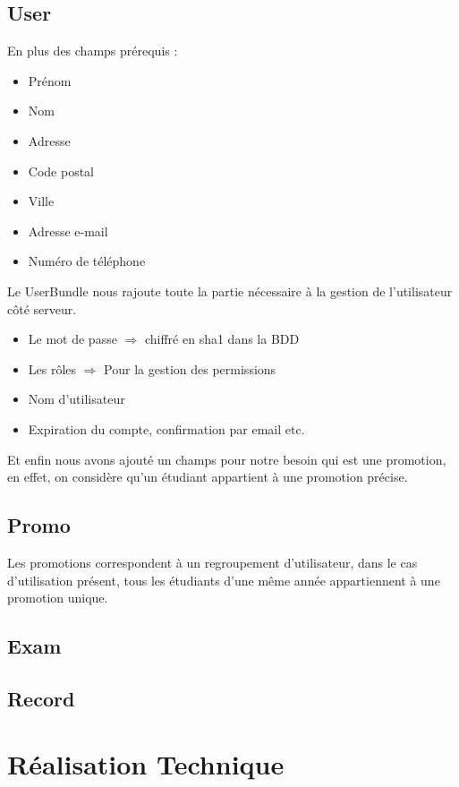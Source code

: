 \documentclass{report}
\begin{document}
    \subsection{User}
      En plus des champs prérequis :
      \begin{itemize}
        \item{Prénom}
        \item{Nom}
        \item{Adresse}
        \item{Code postal}
        \item{Ville}
        \item{Adresse e-mail}
        \item{Numéro de téléphone}
      \end{itemize}

      Le UserBundle nous rajoute toute la partie nécessaire à la gestion de
      l'utilisateur côté serveur.
      \begin{itemize}
        \item{Le mot de passe $\Rightarrow$ chiffré en sha1 dans la BDD}
        \item{Les rôles $\Rightarrow$ Pour la gestion des permissions}
        \item{Nom d'utilisateur}
        \item{Expiration du compte, confirmation par email etc.}
      \end{itemize}

      Et enfin nous avons ajouté un champs pour notre besoin qui est une
      promotion, en effet, on considère qu'un étudiant appartient à une
      promotion précise.

    \subsection{Promo}
      Les promotions correspondent à un regroupement d'utilisateur, dans le
      cas d'utilisation présent, tous les étudiants d'une même année 
      appartiennent à une promotion unique.

    \subsection{Exam}
      
    \subsection{Record}


  \section{Réalisation Technique}
\end{document}

